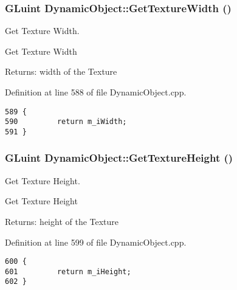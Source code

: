 \hypertarget{class_dynamic_object_dacee7650d9d71a9f1ea7dc6a3c9c774}{
\subsubsection[GetTextureWidth]{\setlength{\rightskip}{0pt plus 5cm}GLuint DynamicObject::GetTextureWidth ()}}
\label{class_dynamic_object_dacee7650d9d71a9f1ea7dc6a3c9c774}


Get Texture Width. 

Get Texture Width

\begin{Desc}
\item[Returns:]width of the Texture \end{Desc}


Definition at line 588 of file DynamicObject.cpp.

\begin{Code}\begin{verbatim}589 {
590         return m_iWidth;
591 }
\end{verbatim}
\end{Code}


\hypertarget{class_dynamic_object_86d1a6d8afebc7d9499fe7a26a1faaf1}{
\subsubsection[GetTextureHeight]{\setlength{\rightskip}{0pt plus 5cm}GLuint DynamicObject::GetTextureHeight ()}}
\label{class_dynamic_object_86d1a6d8afebc7d9499fe7a26a1faaf1}


Get Texture Height. 

Get Texture Height

\begin{Desc}
\item[Returns:]height of the Texture \end{Desc}


Definition at line 599 of file DynamicObject.cpp.

\begin{Code}\begin{verbatim}600 {
601         return m_iHeight;
602 }
\end{verbatim}
\end{Code}


